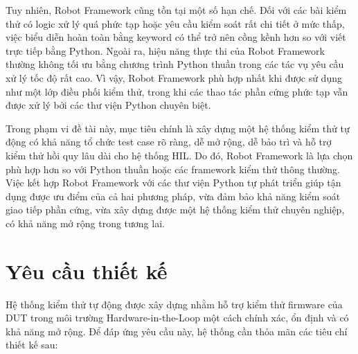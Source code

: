 Tuy nhiên, Robot Framework cũng tồn tại một số hạn chế. Đối với các bài kiểm thử có logic xử lý quá phức tạp hoặc yêu cầu kiểm soát rất chi tiết ở mức thấp, việc biểu diễn hoàn toàn bằng keyword có thể trở nên cồng kềnh hơn so với viết trực tiếp bằng Python. Ngoài ra, hiệu năng thực thi của Robot Framework thường không tối ưu bằng chương trình Python thuần trong các tác vụ yêu cầu xử lý tốc độ rất cao. Vì vậy, Robot Framework phù hợp nhất khi được sử dụng như một lớp điều phối kiểm thử, trong khi các thao tác phần cứng phức tạp vẫn được xử lý bởi các thư viện Python chuyên biệt.

Trong phạm vi đề tài này, mục tiêu chính là xây dựng một hệ thống kiểm thử tự động có khả năng tổ chức test case rõ ràng, dễ mở rộng, dễ bảo trì và hỗ trợ kiểm thử hồi quy lâu dài cho hệ thống HIL. Do đó, Robot Framework là lựa chọn phù hợp hơn so với Python thuần hoặc các framework kiểm thử thông thường. Việc kết hợp Robot Framework với các thư viện Python tự phát triển giúp tận dụng được ưu điểm của cả hai phương pháp, vừa đảm bảo khả năng kiểm soát giao tiếp phần cứng, vừa xây dựng được một hệ thống kiểm thử chuyên nghiệp, có khả năng mở rộng trong tương lai.

\section{Yêu cầu thiết kế}

Hệ thống kiểm thử tự động được xây dựng nhằm hỗ trợ kiểm thử firmware của DUT trong môi trường Hardware-in-the-Loop một cách chính xác, ổn định và có khả năng mở rộng. Để đáp ứng yêu cầu này, hệ thống cần thỏa mãn các tiêu chí thiết kế sau:

